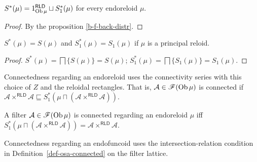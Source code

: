 \begin{prop}
$S^{\ast}(\mu)=1_{\operatorname{Ob}\mu}^{\mathsf{RLD}}\sqcup S_{1}^{\ast}(\mu)$
for every endoreloid $\mu$.\end{prop}
\begin{proof}
By the proposition \ref{b-f-back-distr}.\end{proof}
\begin{prop}
$S^{\ast}(\mu)=S(\mu)$ and $S^{\ast}_1(\mu)=S_1(\mu)$ if $\mu$ is a principal reloid.\end{prop}
\begin{proof}
$S^{\ast}(\mu)=\bigsqcap\{S(\mu)\}=S(\mu)$;
$S^{\ast}_1(\mu)=\bigsqcap\{S_1(\mu)\}=S_1(\mu)$.
\end{proof}
Connectedness regarding an endoreloid uses the connectivity series
with this choice of $Z$ and the reloidal rectangles. That is,
$\mathcal A\in\mathscr F(\operatorname{Ob}\mu)$ is connected if
$\mathcal A\times^{\mathsf{RLD}}\mathcal A
\sqsubseteq S_1^\ast(\mu\sqcap(\mathcal A\times^{\mathsf{RLD}}\mathcal A))$.
\begin{obvious}
A filter $\mathcal{A}\in\mathscr{F}(\operatorname{Ob}\mu)$ is connected regarding
an endoreloid $\mu$ iff $S^{\ast}_1(\mu\sqcap(\mathcal{A}\times^{\mathsf{RLD}}\mathcal{A}))=\mathcal{A}\times^{\mathsf{RLD}}\mathcal{A}$.\end{obvious}
Connectedness regarding an endofuncoid uses the
intersection-relation condition in Definition~\ref{def-osa-connected}
on the filter lattice.

